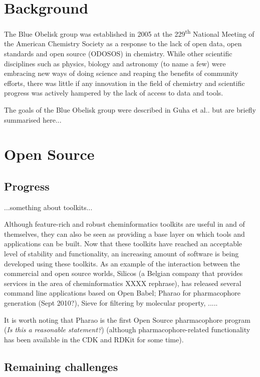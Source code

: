 \documentclass[10pt]{bmc_article}
\newenvironment{bmcformat}{\begin{raggedright}\baselineskip20pt\sloppy\setboolean{publ}{false}}{\end{raggedright}\baselineskip20pt\sloppy}
\begin{document}
\begin{bmcformat}
\section*{Background}
The Blue Obelisk group was established in 2005 at the
229\textsuperscript{th} National Meeting of the American Chemistry
Society as a response to the lack of open data, open standards and
open source (ODOSOS) in chemistry. While other scientific disciplines
such as physics, biology and astronomy (to name a few) were embracing
new ways of doing science and reaping the benefits of community
efforts, there was little if any innovation in the field of chemistry
and scientific progress was actively hampered by the lack of access to
data and tools.

The goals of the Blue Obelisk group were described in Guha et al.\cite{guha2006}. but are briefly summarised here...


\section*{Open Source}
  \subsection*{Progress}

...something about toolkits...

Although feature-rich and robust cheminformatics toolkits are useful in and of themselves, they can also be seen as providing a base layer on which tools and applications can be built. Now that these toolkits have reached an acceptable level of stability and functionality, an increasing amount of software is being developed using these toolkits. As an example of the interaction between the commercial and open source worlds, Silicos (a Belgian company that provides services in the area of cheminformatics XXXX rephrase), has released several command line applications based on Open Babel; Pharao for pharmacophore generation (Sept 2010?), Sieve for filtering by molecular property, ..... 

It is worth noting that Pharao is the first Open Source pharmacophore program (\emph{Is this a reasonable statement?}) (although pharmacophore-related functionality has been available in the CDK and RDKit for some time).

  \subsection*{Remaining challenges}


\end{bmcformat}
\end{document}
